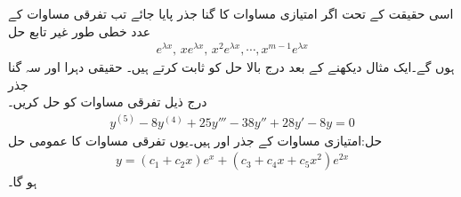 اسی حقیقت کے تحت اگر امتیازی مساوات کا   گنا جذر  پایا جائے تب تفرقی مساوات  کے  عدد خطی طور غیر تابع حل 
\begin{align}\label{مساوات_سادہ_بلند_متعدد_گنا_جذر_الف}
e^{\lambda x}, \, xe^{\lambda x}, \, x^2e^{\lambda x}, \cdots, x^{m-1}e^{\lambda x}
\end{align}
ہوں گے۔ایک مثال دیکھنے کے بعد درج بالا حل کو ثابت کرتے ہیں۔
\quad حقیقی دہرا اور سہ گنا جذر\\
درج ذیل تفرقی مساوات کو حل کریں۔
\begin{align*}
y^{(5)}-8y^{(4)}+25y'''-38y''+28y'-8y=0
\end{align*}
حل:امتیازی مساوات  کے جذر  اور  ہیں۔یوں تفرقی مساوات کا عمومی حل
\begin{align*}
y=(c_1+c_2 x)e^x+(c_3+c_4x+c_5x^2)e^{2x}
\end{align*}
ہو گا۔

